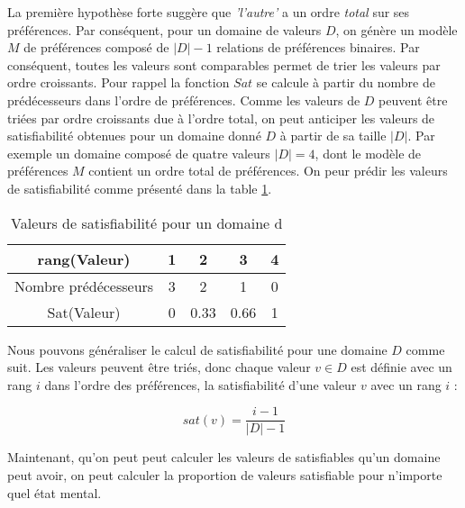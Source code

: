 \documentclass{llncs}
\begin{document}
	La première hypothèse forte suggère que \emph{'l'autre'} a un ordre \emph{total} sur ses préférences. Par conséquent, pour un domaine de valeurs $D$, on génère un modèle $M$ de préférences composé de $|D| -1$ relations de préférences binaires. Par conséquent, toutes les valeurs sont comparables
	 permet de trier les valeurs par ordre croissants.
	 Pour rappel la fonction $Sat$ se calcule à partir du nombre de prédécesseurs dans l'ordre de préférences. Comme les valeurs de $D$ peuvent être triées par ordre croissants due à l'ordre total, on peut anticiper les valeurs de satisfiabilité obtenues pour un domaine donné $D$ à partir de sa taille $|D|$.
	 Par exemple un domaine composé de quatre valeurs $ |D|=4$, dont le modèle de préférences $M$ contient un ordre total de préférences. On peur prédir les valeurs de satisfiabilité comme présenté dans la table \ref{poss}.
	 
	 \begin{table}
	 	\centering
	 	\begin{tabular}{ |c|c|c|c|c| }
		 	\hline				
		 	rang(Valeur) & 1 & 2 & 3 & 4 \\
		 	\hline
		 	Nombre prédécesseurs & 3 & 2 & 1& 0 \\
		 	\hline
		 	Sat(Valeur) & 0 & 0.33 & 0.66 &1 \\
		 	\hline
		 	
	 \end{tabular}
	 \caption{Valeurs de satisfiabilité pour un domaine d}
	 \label{poss}
	 \end{table}
	
	Nous pouvons généraliser le calcul de satisfiabilité pour une domaine $D$ comme suit. Les valeurs peuvent être triés, donc chaque valeur $v \in D$ est définie avec un rang $i$ dans l'ordre des préférences, la satisfiabilité d'une valeur $v$ avec un rang $i$ :
	
	\begin{equation}
		sat(v) = \frac{i-1}{|D|-1}
	\end{equation} 
	
	Maintenant, qu'on peut peut calculer les valeurs de satisfiables qu'un domaine peut avoir, on peut calculer la proportion de valeurs satisfiable pour n'importe quel état mental. 
	
\end{document}
